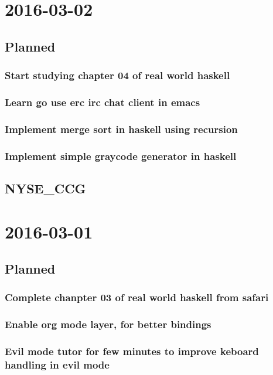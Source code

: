 \documentclass[11pt]{article}
\author{Balaji C}
\date{\today}
\title{}
\begin{document}
\tableofcontents

\section{2016-03-02}
\label{sec:orgheadline7}
\subsection{Planned}
\label{sec:orgheadline5}
\subsubsection{Start studying chapter 04 of real world haskell}
\label{sec:orgheadline1}
\subsubsection{Learn go use erc irc chat client in emacs}
\label{sec:orgheadline2}
\subsubsection{Implement merge sort in haskell using recursion}
\label{sec:orgheadline3}
\subsubsection{Implement simple graycode generator in haskell}
\label{sec:orgheadline4}
\subsection{NYSE\_CCG}
\label{sec:orgheadline6}
\section{2016-03-01}
\label{sec:orgheadline12}
\subsection{Planned}
\label{sec:orgheadline11}
\subsubsection{Complete chanpter 03 of real world haskell from safari}
\label{sec:orgheadline8}
\subsubsection{Enable org mode layer, for better bindings}
\label{sec:orgheadline9}
\subsubsection{Evil mode tutor for few minutes to improve keboard handling in evil mode}
\label{sec:orgheadline10}
\end{document}
